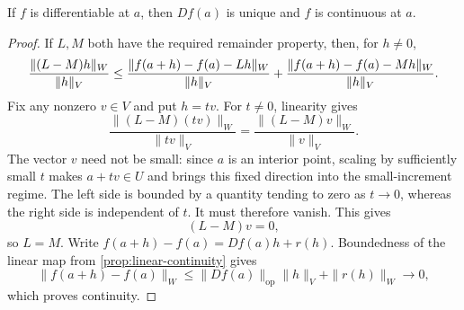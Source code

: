 \begin{proposition}
\label{prop:frechet-uniqueness-continuity}
If $f$ is differentiable at $a$, then $Df(a)$ is unique and $f$ is continuous
at $a$.
\end{proposition}
\begin{proof}
If $L,M$ both have the required remainder property, then, for $h\ne0$,
\[
\frac{\lVert (L-M)h\rVert_W}{\lVert h\rVert_V}
\leq
\frac{\lVert f(a+h)-f(a)-Lh\rVert_W}{\lVert h\rVert_V}
+
\frac{\lVert f(a+h)-f(a)-Mh\rVert_W}{\lVert h\rVert_V}.
\]
Fix any nonzero $v\in V$ and put $h=tv$. For $t\ne0$, linearity gives
\[
\frac{\|(L-M)(tv)\|_W}{\|tv\|_V}
=\frac{\|(L-M)v\|_W}{\|v\|_V}.
\]
The vector $v$ need not be small: since $a$ is an interior point, scaling by
sufficiently small $t$ makes $a+tv\in U$ and brings this fixed direction into
the small-increment regime. The left side is bounded by
a quantity tending to zero as $t\to0$, whereas the right side is
independent of $t$. It must therefore vanish. This gives
\[
(L-M)v=0,
\]
so $L=M$. Write $f(a+h)-f(a)=Df(a)h+r(h)$. Boundedness of the
linear map from \cref{prop:linear-continuity} gives
\[
\|f(a+h)-f(a)\|_W\leq\|Df(a)\|_{\mathrm{op}}\|h\|_V+\|r(h)\|_W\to0,
\]
which proves continuity.
\end{proof}

